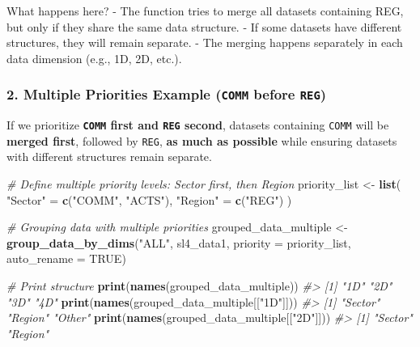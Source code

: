 \documentclass[
]{article}
\newenvironment{Shaded}{\begin{snugshade}}{\end{snugshade}}
\newcommand{\AttributeTok}[1]{\textcolor[rgb]{0.13,0.29,0.53}{#1}}
\newcommand{\CommentTok}[1]{\textcolor[rgb]{0.56,0.35,0.01}{\textit{#1}}}
\newcommand{\ConstantTok}[1]{\textcolor[rgb]{0.56,0.35,0.01}{#1}}
\newcommand{\FunctionTok}[1]{\textcolor[rgb]{0.13,0.29,0.53}{\textbf{#1}}}
\newcommand{\NormalTok}[1]{#1}
\newcommand{\OtherTok}[1]{\textcolor[rgb]{0.56,0.35,0.01}{#1}}
\newcommand{\StringTok}[1]{\textcolor[rgb]{0.31,0.60,0.02}{#1}}
\begin{document}
What happens here? - The function tries to merge all datasets containing
REG, but only if they share the same data structure. - If some datasets
have different structures, they will remain separate. - The merging
happens separately in each data dimension (e.g., 1D, 2D, etc.).

\subsubsection{\texorpdfstring{\textbf{2. Multiple Priorities Example
(\texttt{COMM} before
\texttt{REG})}}{2. Multiple Priorities Example (COMM before REG)}}\label{multiple-priorities-example-comm-before-reg}

If we prioritize \textbf{\texttt{COMM} first and \texttt{REG} second},
datasets containing \texttt{COMM} will be \textbf{merged first},
followed by \texttt{REG}, \textbf{as much as possible} while ensuring
datasets with different structures remain separate.

\begin{Shaded}
\begin{Highlighting}[]
\CommentTok{\# Define multiple priority levels: Sector first, then Region}
\NormalTok{priority\_list }\OtherTok{\textless{}{-}} \FunctionTok{list}\NormalTok{(}
  \StringTok{"Sector"} \OtherTok{=} \FunctionTok{c}\NormalTok{(}\StringTok{"COMM"}\NormalTok{, }\StringTok{"ACTS"}\NormalTok{),}
  \StringTok{"Region"} \OtherTok{=} \FunctionTok{c}\NormalTok{(}\StringTok{"REG"}\NormalTok{)}
\NormalTok{)}

\CommentTok{\# Grouping data with multiple priorities}
\NormalTok{grouped\_data\_multiple }\OtherTok{\textless{}{-}} \FunctionTok{group\_data\_by\_dims}\NormalTok{(}\StringTok{"ALL"}\NormalTok{, sl4\_data1, }
                                            \AttributeTok{priority =}\NormalTok{ priority\_list, }
                                            \AttributeTok{auto\_rename =} \ConstantTok{TRUE}\NormalTok{)}

\CommentTok{\# Print structure}
\FunctionTok{print}\NormalTok{(}\FunctionTok{names}\NormalTok{(grouped\_data\_multiple))}
\CommentTok{\#\textgreater{} [1] "1D" "2D" "3D" "4D"}
\FunctionTok{print}\NormalTok{(}\FunctionTok{names}\NormalTok{(grouped\_data\_multiple[[}\StringTok{"1D"}\NormalTok{]]))}
\CommentTok{\#\textgreater{} [1] "Sector" "Region" "Other"}
\FunctionTok{print}\NormalTok{(}\FunctionTok{names}\NormalTok{(grouped\_data\_multiple[[}\StringTok{"2D"}\NormalTok{]]))}
\CommentTok{\#\textgreater{} [1] "Sector" "Region"}
\end{Highlighting}
\end{Shaded}
\end{document}
